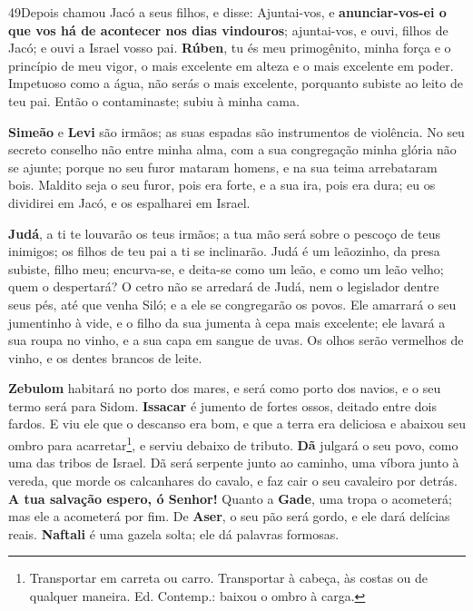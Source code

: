 \smallskip

\lettrine{49} Depois chamou Jacó a seus filhos, e disse:
Ajuntai-vos, e \textbf{anunciar-vos-ei o que vos há de acontecer nos
dias vindouros}; ajuntai-vos, e ouvi, filhos de Jacó; e ouvi a
Israel vosso pai. \textbf{Rúben}, tu és meu primogênito, minha
força e o princípio de meu vigor, o mais excelente em alteza e o
mais excelente em poder. Impetuoso como a água, não serás o mais
excelente, porquanto subiste ao leito de teu pai. Então o
contaminaste; subiu à minha cama.

\textbf{Simeão} e \textbf{Levi} são irmãos; as suas espadas são
instrumentos de violência. No seu secreto conselho não entre
minha alma, com a sua congregação minha glória não se ajunte; porque
no seu furor mataram homens, e na sua teima arrebataram bois.
Maldito seja o seu furor, pois era forte, e a sua ira, pois era
dura; eu os dividirei em Jacó, e os espalharei em Israel.

\textbf{Judá}, a ti te louvarão os teus irmãos; a tua mão será
sobre o pescoço de teus inimigos; os filhos de teu pai a ti se
inclinarão. Judá é um leãozinho, da presa subiste, filho meu;
encurva-se, e deita-se como um leão, e como um leão velho; quem o
despertará? O cetro não se arredará de Judá, nem o legislador
dentre seus pés, até que venha Siló; e a ele se congregarão os
povos. Ele amarrará o seu jumentinho à vide, e o filho da sua
jumenta à cepa mais excelente; ele lavará a sua roupa no vinho, e a
sua capa em sangue de uvas. Os olhos serão vermelhos de
vinho, e os dentes brancos de leite.

\textbf{Zebulom} habitará no porto dos mares, e será como porto
dos navios, e o seu termo será para Sidom. \textbf{Issacar} é
jumento de fortes ossos, deitado entre dois fardos. E viu ele
que o descanso era bom, e que a terra era deliciosa e abaixou seu
ombro para acarretar\footnote{Transportar em carreta ou carro.
Transportar à cabeça, às costas ou de qualquer maneira. Ed.
Contemp.: baixou o ombro à carga.}, e serviu debaixo de tributo.
\textbf{Dã} julgará o seu povo, como uma das tribos de
Israel. Dã será serpente junto ao caminho, uma víbora junto à
vereda, que morde os calcanhares do cavalo, e faz cair o seu
cavaleiro por detrás. \textbf{A tua salvação espero, ó
Senhor!} Quanto a \textbf{Gade}, uma tropa o acometerá; mas
ele a acometerá por fim. De \textbf{Aser}, o seu pão será
gordo, e ele dará delícias reais. \textbf{Naftali} é uma
gazela solta; ele dá palavras formosas.

